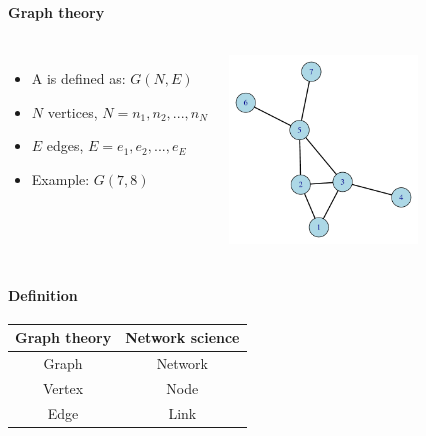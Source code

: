 \documentclass[8pt]{beamer}
\begin{document}
\begin{frame}
\frametitle{\insertsection}
\framesubtitle{Graph theory}

\begin{columns}[c]
	\begin{itemize}
	\item A {\color{blue}{graph}} is defined as: $G(N, E)$
	\item $N$ vertices, $N = {n_1, n_2, ..., n_N}$
	\item $E$ edges, $E = {e_1, e_2, ..., e_E}$
	\item Example: $G(7,8)$
	\end{itemize}

\centering
\includegraphics[width=5cm]{base}
\end{columns}

\end{frame}


\begin{frame}
\frametitle{\insertsection}
\framesubtitle{Definition}

\centering
\def\arraystretch{1.5}
\begin{tabular}{cc}
\toprule
\textbf{Graph theory} & \textbf{Network science}\\
\hline
Graph & Network\\
Vertex & Node\\
Edge & Link\\
\bottomrule
\end{tabular}

\end{frame}

\end{document}
